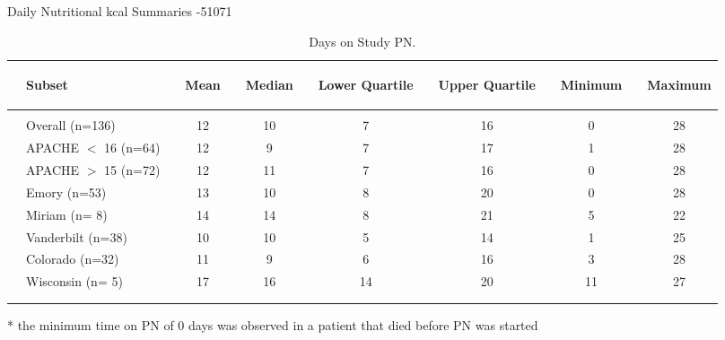\documentclass[dvips, 10pt]{article}
\begin{document}
\begin{sidewaystable}
\caption{Daily Nutritional kcal Summaries -51071}
\end{sidewaystable}
\clearpage
\begin{table}[t]
\caption
{ Days on Study PN. }
\begin{center}
\begin{tabular}{ @{}l@{}
@{}l@{}@{}p{1.5em}@{}@{}c@{}@{}p{1.5em}@{}@{}c@{}@{}p{1.5em}@{}@{}c@{}@{}p{1.5em}@{}@{}c@{}@{}p{1.5em}@{}@{}c@{}@{}p{1.5em}@{}@{}c@{}
}
\hline

& \parbox{6em}{\begin{center}Subset\end{center}} && \parbox{6em}{\begin{center}Mean\end{center}} && \parbox{6em}{\begin{center}Median\end{center}} && \parbox{6em}{\begin{center}Lower Quartile\end{center}} && \parbox{6em}{\begin{center}Upper Quartile\end{center}} && \parbox{6em}{\begin{center}Minimum\end{center}} && \parbox{6em}{\begin{center}Maximum\end{center}} \\

\hline

\\
& Overall (n=136) && 12 && 10 && 7 && 16 && 0 && 28 \\
& APACHE  $<$ 16 (n=64) && 12 && 9 && 7 && 17 && 1 && 28 \\
& APACHE  $>$ 15 (n=72) && 12 && 11 && 7 && 16 && 0 && 28 \\
& Emory (n=53) && 13 && 10 && 8 && 20 && 0 && 28 \\
& Miriam (n= 8) && 14 && 14 && 8 && 21 && 5 && 22 \\
& Vanderbilt (n=38) && 10 && 10 && 5 && 14 && 1 && 25 \\
& Colorado (n=32) && 11 && 9 && 6 && 16 && 3 && 28 \\
& Wisconsin (n= 5) && 17 && 16 && 14 && 20 && 11 && 27 \\
\\
\hline \\

\end{tabular}


\parbox{ 5in }{ * the minimum time on PN of 0 days was observed in a patient that died before PN was started } \\
 \vspace{1em}\end{center}
 \end{table}
\clearpage
\end{document}
